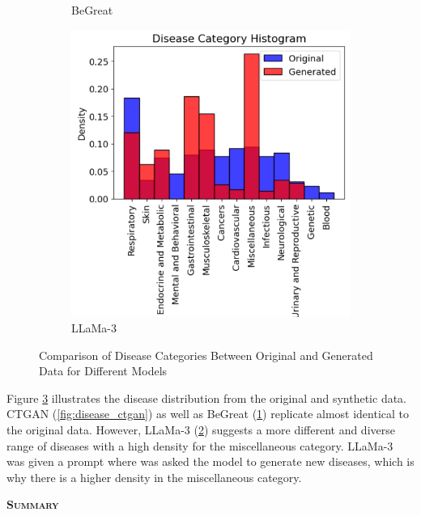 \begin{figure}[H]
\begin{subfigure}[b]{0.45\textwidth}
        \caption{BeGreat}
        \label{fig:disease_begreat}
    \end{subfigure}
    \hfill
    \begin{subfigure}[b]{0.45\textwidth}
        \centering
        \includegraphics[width=\textwidth]{images/disease_llama.png}
        \caption{LLaMa-3}
        \label{fig:disease_llama}
    \end{subfigure}
    \caption{Comparison of Disease Categories Between Original and Generated Data for Different Models}
    \label{fig:disease_distrib}
\end{figure}

Figure \ref{fig:disease_distrib} illustrates the disease distribution from the original and synthetic data. CTGAN (\ref{fig:disease_ctgan}) as well as BeGreat (\ref{fig:disease_begreat}) replicate almost identical to the original data. However, LLaMa-3 (\ref{fig:disease_llama}) suggests a more different and diverse range of diseases with a high density for the miscellaneous category. LLaMa-3 was given a prompt where was asked the model to generate new diseases, which is why there is a higher density in the miscellaneous category.

\vspace{1cm}

\noindent \textsc{ \textbf{Summary}}

